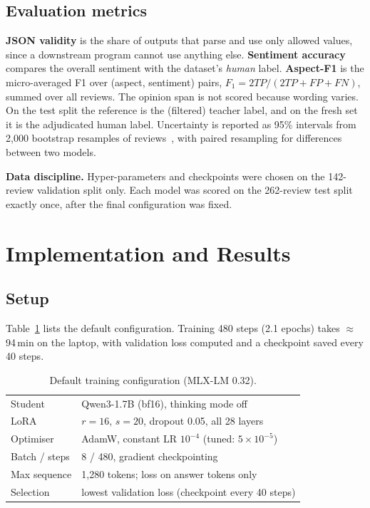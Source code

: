 \documentclass[journal]{IEEEtran}
\begin{document}
\subsection{Evaluation metrics}
\textbf{JSON validity} is the share of outputs that parse and use only allowed values, since a downstream program cannot
use anything else. \textbf{Sentiment accuracy} compares the overall sentiment with the dataset's \emph{human} label.
\textbf{Aspect-F1} is the micro-averaged F1 over (aspect, sentiment) pairs, $F_1 = 2TP/(2TP+FP+FN)$, summed over all
reviews. The opinion span is not scored because wording varies. On the test split the reference is the (filtered)
teacher label, and on the fresh set it is the adjudicated human label. Uncertainty is reported as 95\% intervals from
2{,}000 bootstrap resamples of reviews~\cite{efron1993bootstrap}, with paired resampling for differences between two
models.

\textbf{Data discipline.} Hyper-parameters and checkpoints were chosen on the 142-review validation split only. Each
model was scored on the 262-review test split exactly once, after the final configuration was fixed.

\section{Implementation and Results}

\subsection{Setup}
Table~\ref{tab:hparams} lists the default configuration. Training 480 steps (2.1 epochs) takes $\approx$94\,min on the
laptop, with validation loss computed and a checkpoint saved every 40 steps.

\begin{table}[t]
\centering
\caption{Default training configuration (MLX-LM 0.32).}
\label{tab:hparams}
\setlength{\tabcolsep}{4pt}
\begin{tabular}{ll}
\toprule
Student & Qwen3-1.7B (bf16), thinking mode off \\
LoRA & $r=16$, $s=20$, dropout 0.05, all 28 layers \\
Optimiser & AdamW, constant LR $10^{-4}$ (tuned: $5{\times}10^{-5}$) \\
Batch / steps & 8 / 480, gradient checkpointing \\
Max sequence & 1{,}280 tokens; loss on answer tokens only \\
Selection & lowest validation loss (checkpoint every 40 steps) \\
\bottomrule
\end{tabular}
\end{table}
\end{document}
